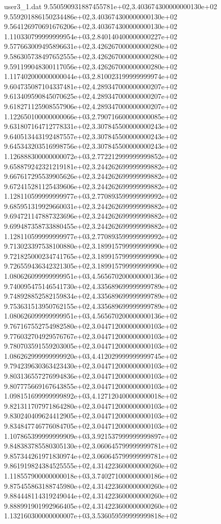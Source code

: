 \begin{filecontents}{user3_1.dat}
9.550590931887455781e+02,3.403674300000000130e+02
9.559201886150234486e+02,3.403674300000000130e+02
9.564126970691676206e+02,3.403674300000000130e+02
1.110330799999999954e+03,2.840140400000000227e+02
9.577663009495896631e+02,3.426267000000000280e+02
9.586305738497652555e+02,3.426267000000000280e+02
9.591199048300117056e+02,3.426267000000000280e+02
1.117402000000000044e+03,2.810023199999999974e+02
9.604735087104337481e+02,4.289347000000000207e+02
9.613409590845070625e+02,4.289347000000000207e+02
9.618271125908557906e+02,4.289347000000000207e+02
1.122650100000000066e+03,2.790716600000000085e+02
9.631807164712778331e+02,3.307845500000000243e+02
9.640513443192487557e+02,3.307845500000000243e+02
9.645343203516998756e+02,3.307845500000000243e+02
1.126888300000000072e+03,2.772212999999999852e+02
9.658879242321219181e+02,3.244262699999999882e+02
9.667617295539905626e+02,3.244262699999999882e+02
9.672415281125439606e+02,3.244262699999999882e+02
1.128110599999999977e+03,2.770893599999999992e+02
9.685951319929660031e+02,3.244262699999999882e+02
9.694721147887323696e+02,3.244262699999999882e+02
9.699487358733880455e+02,3.244262699999999882e+02
1.128110599999999977e+03,2.770893599999999992e+02
9.713023397538100880e+02,3.189915799999999990e+02
9.721825000234741765e+02,3.189915799999999990e+02
9.726559436342321305e+02,3.189915799999999990e+02
1.080626099999999951e+03,4.565670200000000136e+02
9.740095475146541730e+02,4.335689699999999789e+02
9.748928852582159834e+02,4.335689699999999789e+02
9.753631513950762155e+02,4.335689699999999789e+02
1.080626099999999951e+03,4.565670200000000136e+02
9.767167552754982580e+02,3.044712000000000103e+02
9.776032704929576767e+02,3.044712000000000103e+02
9.780703591559203005e+02,3.044712000000000103e+02
1.086262999999999920e+03,4.412029999999999745e+02
9.794239630363423430e+02,3.044712000000000103e+02
9.803136557276994836e+02,3.044712000000000103e+02
9.807775669167643855e+02,3.044712000000000103e+02
1.098151699999999892e+03,4.127120400000000018e+02
9.821311707971864280e+02,3.044712000000000103e+02
9.830240409624412905e+02,3.044712000000000103e+02
9.834847746776084705e+02,3.044712000000000103e+02
1.107865399999999909e+03,3.921537999999999897e+02
9.848383785580305130e+02,3.060645799999999781e+02
9.857344261971830974e+02,3.060645799999999781e+02
9.861919824384525555e+02,4.314223600000000260e+02
1.118557900000000018e+03,3.740271000000000186e+02
9.875455863188745980e+02,4.314223600000000260e+02
9.884448114319249044e+02,4.314223600000000260e+02
9.888991901992966405e+02,4.314223600000000260e+02
1.132160300000000007e+03,3.536059599999999818e+02

\end{filecontents}
